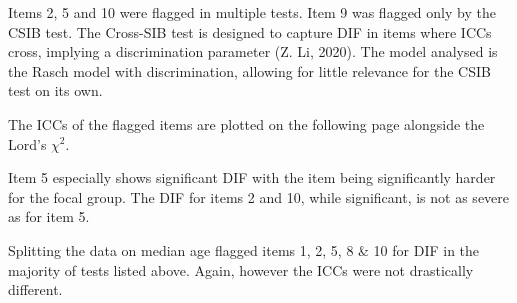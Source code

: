 \documentclass[
  man,floatsintext]{apa6}
\begin{document}
\tiny
\begin{table}[H]
\centering\begingroup\fontsize{7}{9}\selectfont

\endgroup{}
\end{table}
\normalsize

Items 2, 5 and 10 were flagged in multiple tests. Item 9 was flagged only by the CSIB test. The Cross-SIB test is designed to capture DIF in items where ICCs cross, implying a discrimination parameter (Z. Li, 2020). The model analysed is the Rasch model with discrimination, allowing for little relevance for the CSIB test on its own.

The ICCs of the flagged items are plotted on the following page alongside the Lord's \(\chi^2\).

Item 5 especially shows significant DIF with the item being significantly harder for the focal group. The DIF for items 2 and 10, while significant, is not as severe as for item 5.

Splitting the data on median age flagged items 1, 2, 5, 8 \& 10 for DIF in the majority of tests listed above. Again, however the ICCs were not drastically different.
\end{document}
